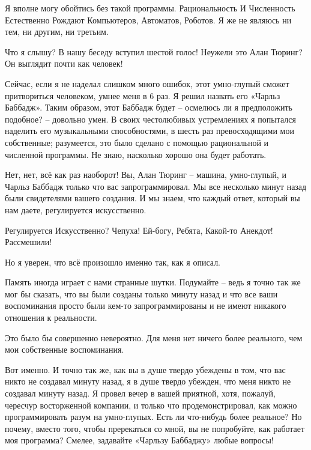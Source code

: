 \documentclass[../main.tex]{subfiles}
\begin{document}
\begin{dialogue}
 Я вполне могу обойтись без такой программы. Рациональность И Численность Естественно Рождают Компьютеров, Автоматов, Роботов. Я же не являюсь ни тем, ни другим, ни третьим.

 Что я слышу? В нашу беседу вступил шестой голос! Неужели это Алан Тюринг? Он выглядит почти как человек!


 Сейчас, если я не наделал слишком много ошибок, этот умно-глупый сможет притвориться человеком, умнее меня в 6 раз. Я решил назвать его «Чарльз Баббадж». Таким образом, этот Баббадж будет \--- осмелюсь ли я предположить подобное? \--- довольно умен. В своих честолюбивых устремлениях я попытался наделить его музыкальными способностями, в шесть раз превосходящими мои собственные; разумеется, это было сделано с помощью рациональной и численной программы. Не знаю, насколько хорошо она будет работать.

 Нет, нет, всё как раз наоборот! Вы, Алан Тюринг \--- машина, умно-глупый, и Чарльз Баббадж только что вас запрограммировал. Мы все несколько минут назад были свидетелями вашего создания. И мы знаем, что каждый ответ, который вы нам даете, регулируется искусственно.

 Регулируется Искусственно? Чепуха! Ей-богу, Ребята, Какой-то Анекдот! Рассмешили!

 Но я уверен, что всё произошло именно так, как я описал.

 Память иногда играет с нами странные шутки. Подумайте \--- ведь я точно так же мог бы сказать, что вы были созданы только минуту назад и что все ваши воспоминания просто были кем-то запрограммированы и не имеют никакого отношения к реальности.

 Это было бы совершенно невероятно. Для меня нет ничего более реального, чем мои собственные воспоминания.

 Вот именно. И точно так же, как вы в душе твердо убеждены в том, что вас никто не создавал минуту назад, я в душе твердо убежден, что меня никто не создавал минуту назад. Я провел вечер в вашей приятной, хотя, пожалуй, чересчур восторженной компании, и только что продемонстрировал, как можно программировать разум на умно-глупых. Есть ли что-нибудь более реальное? Но почему, вместо того, чтобы пререкаться со мной, вы не попробуйте, как работает моя программа? Смелее, задавайте «Чарльзу Баббаджу» любые вопросы!


\end{dialogue}
\end{document}

